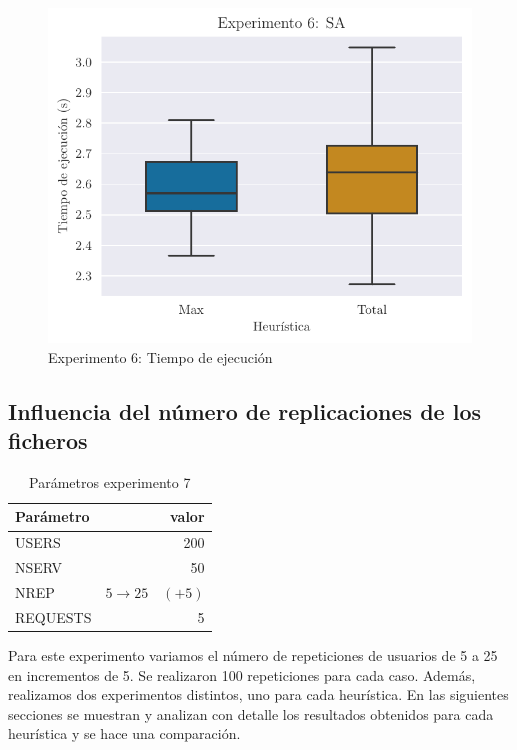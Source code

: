 \begin{figure}[H]
    \centering
    \includegraphics{include/plots/ex6_time_bplot.pdf}
    \caption{Experimento 6: Tiempo de ejecución}%
    \label{fig:ex5ttt}
\end{figure}

\subsection{Influencia del número de replicaciones de los ficheros}

\begin{table}[H]
    \caption{Parámetros experimento 7}%
    \label{tab:ex7_par}
    \begin{center}
    \begin{tabular}{lr}
    \toprule
    Parámetro & valor \\
    \midrule
    USERS & 200 \\
    NSERV & 50 \\
    NREP & $5 \to 25 \quad (+5)$ \\
    REQUESTS & 5\\
    \bottomrule
    \end{tabular}
    \end{center}
\end{table}

Para este experimento variamos el número de repeticiones de usuarios de 5 a 25 en incrementos de 5. Se realizaron 100
repeticiones para cada caso. Además, realizamos dos experimentos distintos, uno para cada heurística. En las
siguientes secciones se muestran y analizan con detalle los resultados obtenidos para cada heurística y se hace una
comparación.

